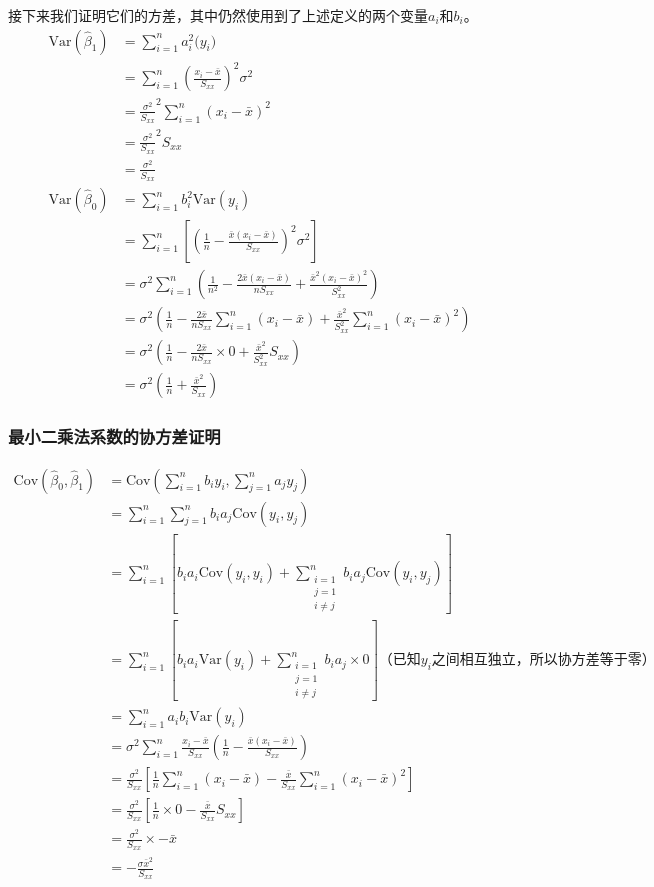 \documentclass[UTF8]{ctexart}
\begin{document}
接下来我们证明它们的方差，其中仍然使用到了上述定义的两个变量$a_i$和$b_i$。
\begin{align*}
	\mathrm{Var}(\hat\beta_1)&=\sum_{i=1}^na_i^2\mathrm(y_i)\\
	&=\sum_{i=1}^n\left(\frac{x_i-\bar x}{S_{xx}}\right)^2\sigma^2\\
	&=\frac{\sigma^2}{S_{xx}}^2\sum_{i=1}^n(x_i-\bar x)^2\\
	&=\frac{\sigma^2}{S_{xx}}^2S_{xx}\\
	&=\frac{\sigma^2}{S_{xx}}\\
	\mathrm{Var}(\hat\beta_0)&=\sum_{i=1}^nb_i^2\mathrm{Var}(y_i)\\
	&=\sum_{i=1}^n\left[\left(\frac{1}{n}-\frac{\bar x(x_i-\bar x)}{S_{xx}}\right)^2\sigma^2\right]\\
	&=\sigma^2\sum_{i=1}^n\left(\frac{1}{n^2}-\frac{2\bar x(x_i-\bar x)}{nS_{xx}}+\frac{\bar x^2(x_i-\bar x)^2}{S_{xx}^2}\right)\\
	&=\sigma^2\left(\frac{1}{n}-\frac{2\bar x}{nS_{xx}}\sum_{i=1}^n(x_i-\bar x)+\frac{\bar x^2}{S_{xx}^2}\sum_{i=1}^n(x_i-\bar x)^2\right)\\
	&=\sigma^2\left(\frac{1}{n}-\frac{2\bar x}{nS_{xx}}\times 0+\frac{\bar x^2}{S_{xx}^2}S_{xx}\right)\\
	&=\sigma^2\left(\frac{1}{n}+\frac{\bar x^2}{S_{xx}}\right)
\end{align*}

\subsubsection{最小二乘法系数的协方差证明}
\label{proof18}
\begin{align*}
	\mathrm{Cov}(\hat\beta_0,\hat\beta_1)&=\mathrm{Cov}(\sum_{i=1}^nb_iy_i,\sum_{j=1}^na_jy_j)\\
	&=\sum_{i=1}^n\sum_{j=1}^nb_ia_j\mathrm{Cov}(y_i,y_j)\\
	&=\sum_{i=1}^n\left[b_ia_i\mathrm{Cov}(y_i,y_i)+\sum_{\substack{i=1\\j=1\\i\neq j}}^nb_ia_j\mathrm{Cov}(y_i,y_j)\right]\\
	&=\sum_{i=1}^n\left[b_ia_i\mathrm{Var}(y_i)+\sum_{\substack{i=1\\j=1\\i\neq j}}^nb_ia_j\times 0\right]\text{（已知$y_i$之间相互独立，所以协方差等于零）}\\
	&=\sum_{i=1}^na_ib_i\mathrm{Var}(y_i)\\
	&=\sigma^2\sum_{i=1}^n\frac{x_i-\bar x}{S_{xx}}\left(\frac{1}{n}-\frac{\bar x(x_i-\bar x)}{S_{xx}}\right)\\
	&=\frac{\sigma^2}{S_{xx}}\left[\frac{1}{n}\sum_{i=1}^n(x_i-\bar x)-\frac{\bar x}{S_{xx}}\sum_{i=1}^n(x_i-\bar x)^2\right]\\
	&=\frac{\sigma^2}{S_{xx}}\left[\frac{1}{n}\times 0-\frac{\bar x}{S_{xx}}S_{xx}\right]\\
	&=\frac{\sigma^2}{S_{xx}}\times-\bar x\\
	&=-\frac{\sigma\bar x^2}{S_{xx}}
\end{align*}
\end{document}
